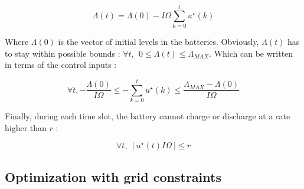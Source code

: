 \documentclass[conference]{IEEEtran}
\begin{document}
\begin{equation}
\Lambda(t)  = \Lambda(0) - I \Omega \sum_{k=0}^{t}u^{\star}(k)
\end{equation}

Where $ \Lambda(0) $ is the vector of initial levels in the batteries. Obviously, $\Lambda(t)$ has to stay within possible bounds : $ \forall t, \ \ 0 \leq \Lambda(t) \leq \Lambda_{MAX} $. Which can be written in terms of the control inputs :

\begin{equation}
\label{level_constraints}
\forall t,-\frac{\Lambda(0)}{I \Omega} \leq -\sum_{k=0}^{t}u^{\star}(k) \leq \frac{ \Lambda_{MAX} - \Lambda(0)}{I \Omega}
\end{equation}

Finally, during each time slot, the battery cannot charge or discharge at a rate higher than $ r $ : 

\begin{equation}
\label{rate_constraints}
 \forall t,\ \ \left|\ u^{\star}(t)I \Omega\ \right| \leq r 
 \end{equation}

\subsection{Optimization with grid constraints}
\end{document}
